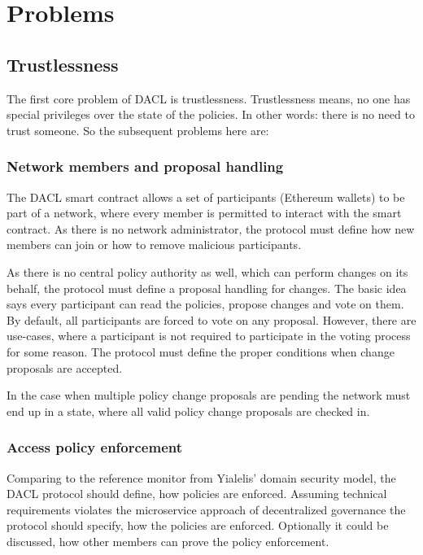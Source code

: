 \documentclass[12pt, conference]{IEEEtran}
\begin{document}
\section{Problems}



\subsection{Trustlessness}

The first core problem of DACL is trustlessness. Trustlessness means, no one has special privileges over the state of the policies.  In other words: there is no need to trust someone. So the subsequent problems here are: \\

\subsubsection{Network members and proposal handling}

The DACL smart contract allows a set of participants (Ethereum wallets) to be part of a network, where every member is permitted to interact with the smart contract. As there is no network administrator, the protocol must define how new members can join or how to remove malicious participants. 

As there is no central policy authority as well, which can perform changes on its behalf, the protocol must define a proposal handling for changes. The basic idea says every participant can read the policies, propose changes and vote on them. By default, all participants are forced to vote on any proposal. However, there are use-cases, where a participant is not required to participate in the voting process for some reason. The protocol must define the proper conditions when change proposals are accepted.

In the case when multiple policy change proposals are pending the network must end up in a state, where all valid policy change proposals are checked in.

\subsubsection{Access policy enforcement}

Comparing to the reference monitor from Yialelis' domain security model, the DACL protocol should define, how policies are enforced. Assuming technical requirements violates the microservice approach of decentralized governance the protocol should specify, how the policies are enforced. Optionally it could be discussed, how other members can prove the policy enforcement.
\end{document}

